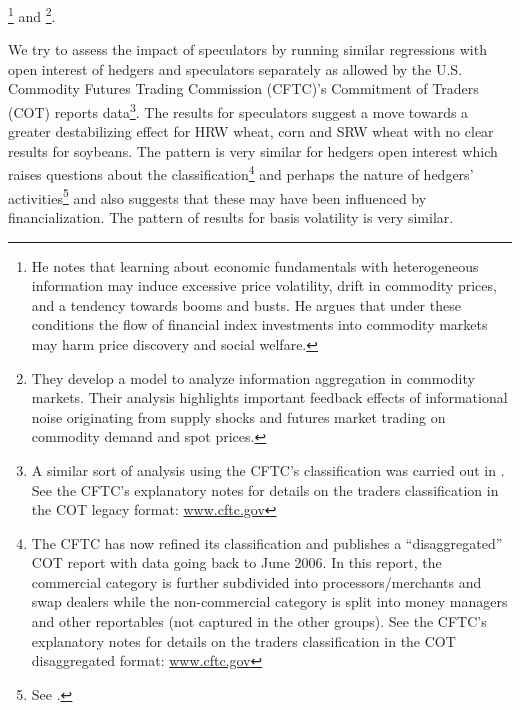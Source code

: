 \documentclass[12pt,]{article}
\let\rmarkdownfootnote\footnote%
\def\footnote{\protect\rmarkdownfootnote}
\begin{document}
\citet{singleton_investor_2013}\footnote{He notes that learning about
  economic fundamentals with heterogeneous information may induce
  excessive price volatility, drift in commodity prices, and a tendency
  towards booms and busts. He argues that under these conditions the
  flow of financial index investments into commodity markets may harm
  price discovery and social welfare.} and
\citet{sockin_informational_2015}\footnote{They develop a model to
  analyze information aggregation in commodity markets. Their analysis
  highlights important feedback effects of informational noise
  originating from supply shocks and futures market trading on commodity
  demand and spot prices.}.

We try to assess the impact of speculators by running similar
regressions with open interest of hedgers and speculators separately as
allowed by the U.S. Commodity Futures Trading Commission (CFTC)'s
Commitment of Traders (COT) reports data\footnote{A similar sort of
  analysis using the CFTC's classification was carried out in
  \citet{wang_behavior_2003}. See the CFTC's explanatory notes for
  details on the traders classification in the COT legacy format:
  \href{http://www.cftc.gov/MarketReports/CommitmentsofTraders/ExplanatoryNotes/index.htm}{www.cftc.gov}}.
The results for speculators suggest a move towards a greater
destabilizing effect for HRW wheat, corn and SRW wheat with no clear
results for soybeans. The pattern is very similar for hedgers open
interest which raises questions about the classification\footnote{The
  CFTC has now refined its classification and publishes a
  ``disaggregated'' COT report with data going back to June 2006. In
  this report, the commercial category is further subdivided into
  processors/merchants and swap dealers while the non-commercial
  category is split into money managers and other reportables (not
  captured in the other groups). See the CFTC's explanatory notes for
  details on the traders classification in the COT disaggregated format:
  \href{http://www.cftc.gov/MarketReports/CommitmentsofTraders/DisaggregatedExplanatoryNotes/index.htm}{www.cftc.gov}}
and perhaps the nature of hedgers' activities\footnote{See
  \citet{cheng_why_2014}.} and also suggests that these may have been
influenced by financialization. The pattern of results for basis
volatility is very similar.
\end{document}
